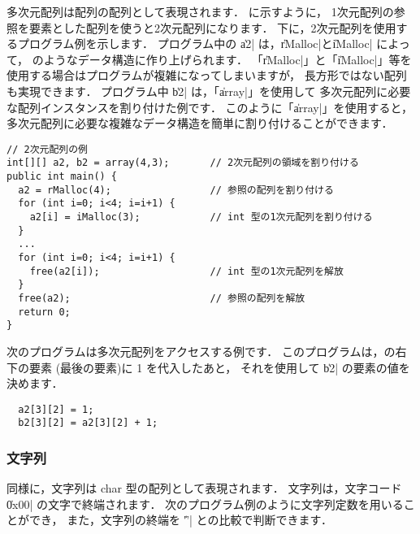 多次元配列は配列の配列として表現されます．
に示すように，
1次元配列の参照を要素とした配列を使うと2次元配列になります．
下に，2次元配列を使用するプログラム例を示します．
プログラム中の \|a2| は，\|rMalloc|と\|iMalloc| によって，
のようなデータ構造に作り上げられます．
「\|rMalloc|」と「\|iMalloc|」等を使用する場合はプログラムが複雑になってしまいますが，
長方形ではない配列も実現できます．
プログラム中 \|b2| は，「\|array|」を使用して
多次元配列に必要な配列インスタンスを割り付けた例です．
このように「\|array|」を使用すると，
多次元配列に必要な複雑なデータ構造を簡単に割り付けることができます．



\begin{mylist}
\begin{verbatim}
// 2次元配列の例
int[][] a2, b2 = array(4,3);       // 2次元配列の領域を割り付ける
public int main() {
  a2 = rMalloc(4);                 // 参照の配列を割り付ける
  for (int i=0; i<4; i=i+1) {
    a2[i] = iMalloc(3);            // int 型の1次元配列を割り付ける
  }
  ...
  for (int i=0; i<4; i=i+1) {
    free(a2[i]);                   // int 型の1次元配列を解放
  }
  free(a2);                        // 参照の配列を解放
  return 0;
}
\end{verbatim}
\end{mylist}

次のプログラムは多次元配列をアクセスする例です．
このプログラムは，の右下の要素
(最後の要素)に 1 を代入したあと，
それを使用して \|b2| の要素の値を決めます．

\begin{mylist}
\begin{verbatim}
  a2[3][2] = 1;
  b2[3][2] = a2[3][2] + 1;
\end{verbatim}
\end{mylist}

\subsubsection{文字列}

\cl 同様に，文字列は char 型の配列として表現されます．
文字列は，文字コード \|0x00| の文字で終端されます．
次のプログラム例のように文字列定数を用いることができ，
また，文字列の終端を \|'\0'| との比較で判断できます．

